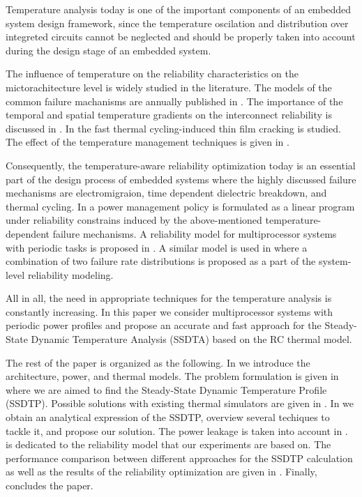 Temperature analysis today is one of the important components of an embedded system design framework, since the temperature oscilation and distribution over integreted circuits cannot be neglected and should be properly taken into account during the design stage of an embedded system.

The influence of temperature on the reliability characteristics on the mictorachitecture level is widely studied in the literature. The models of the common failure machanisms are annually published in \cite{jedec2010}. The importance of the temporal and spatial temperature gradients on the interconnect reliability is discussed in \cite{lu2004}. In \cite{hieu2004} the fast thermal cycling-induced thin film cracking is studied. The effect of the temperature management techniques is given in \cite{srinivasan2003}.

Consequently, the temperature-aware reliability optimization today is an essential part of the design process of embedded systems where the highly discussed failure mechanisms are electromigraion, time dependent dielectric breakdown, and thermal cycling. In \cite{coskun2006} a power management policy is formulated as a linear program under reliability constrains induced by the above-mentioned temperature-dependent failure mechanisms. A reliability model for multiprocessor systems with periodic tasks is proposed in \cite{huang2009}. A similar model is used in \cite{xiang2010} where a combination of two failure rate distributions is proposed as a part of the system-level reliability modeling.

All in all, the need in appropriate techniques for the temperature analysis is constantly increasing. In this paper we consider multiprocessor systems with periodic power profiles and propose an accurate and fast approach for the Steady-State Dynamic Temperature Analysis (SSDTA) based on the RC thermal model.

The rest of the paper is organized as the following. In  we introduce the architecture, power, and thermal models. The problem formulation is given in  where we are aimed to find the Steady-State Dynamic Temperature Profile (SSDTP). Possible solutions with existing thermal simulators are given in . In  we obtain an analytical expression of the SSDTP, overview several techiques to tackle it, and propose our solution. The power leakage is taken into account in .  is dedicated to the reliability model that our experiments are based on. The performance comparison between different approaches for the SSDTP calculation as well as the results of the reliability optimization are given in . Finally,  concludes the paper.
